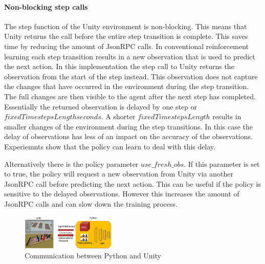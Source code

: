 \paragraph{Non-blocking step calls}
The step function of the Unity environment is non-blocking. This means that Unity returns the call before the entire step transition is complete. This saves time by reducing the amount of JsonRPC calls. In conventional reinforcement learning each step transition results in a new observation that is used to predict the next action. In this implementation the step call to Unity returns the observation from the start of the step instead. This observation does not capture the changes that have occurred in the environment during the step transition. The full changes are then visible to the agent after the next step has completed. Essentially the returned observation is delayed by one step or $fixedTimestepsLength seconds$. A shorter $fixedTimestepsLength$ results in smaller changes of the environment during the step transitions. In this case the delay of observations has less of an impact on the accuracy of the observations.
Experiemnts show that the policy can learn to deal with this delay.

Alternatively there is the policy parameter $use\_fresh\_obs$. If this parameter is set to true, the policy will request a new observation from Unity via another JsonRPC call before predicting the next action. This can be useful if the policy is sensitive to the delayed observations. However this increases the amount of JsonRPC calls and can slow down the training process.




\begin{figure}
    \centering
    \includegraphics[width=0.4\textwidth]{Bilder/unity_communication.png}
    \caption{Communication between Python and Unity}
    \label{fig:communication_python_unity}
\end{figure} %





